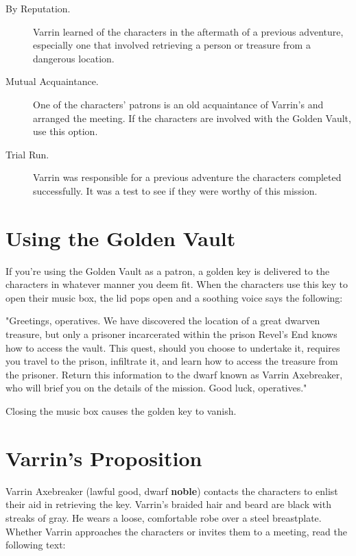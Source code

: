 \documentclass[10pt,a4paper,twoside,bg=print,twocolumn,openany,nodeprecatedcode]{dndbook}
\begin{document}
\begin{description}
\item[By Reputation.]
Varrin learned of the characters in the aftermath of a previous adventure, especially one that involved retrieving a person or treasure from a dangerous location.
\item[Mutual Acquaintance.]
One of the characters' patrons is an old acquaintance of Varrin's and arranged the meeting. If the characters are involved with the Golden Vault, use this option.
\item[Trial Run.]
Varrin was responsible for a previous adventure the characters completed successfully. It was a test to see if they were worthy of this mission.
\end{description}

\section{Using the Golden Vault}
If you're using the Golden Vault as a patron, a golden key is delivered to the characters in whatever manner you deem fit. When the characters use this key to open their music box, the lid pops open and a soothing voice says the following:

\begin{DndReadAloud}{}
"Greetings, operatives. We have discovered the location of a great dwarven treasure, but only a prisoner incarcerated within the prison Revel's End knows how to access the vault. This quest, should you choose to undertake it, requires you travel to the prison, infiltrate it, and learn how to access the treasure from the prisoner. Return this information to the dwarf known as Varrin Axebreaker, who will brief you on the details of the mission. Good luck, operatives."

\end{DndReadAloud}

Closing the music box causes the golden key to vanish.

\section{Varrin's Proposition}
Varrin Axebreaker (lawful good, dwarf \textbf{noble}) contacts the characters to enlist their aid in retrieving the key. Varrin's braided hair and beard are black with streaks of gray. He wears a loose, comfortable robe over a steel breastplate. Whether Varrin approaches the characters or invites them to a meeting, read the following text:
\end{document}
